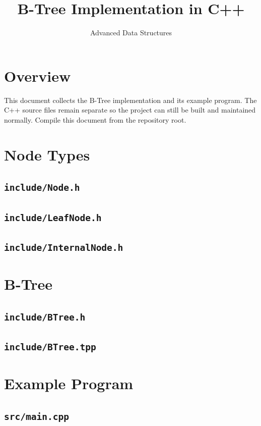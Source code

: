 \documentclass[11pt,a4paper]{article}
\title{B-Tree Implementation in C++}
\author{Advanced Data Structures}
\date{}
\begin{document}
\maketitle

\section{Overview}

This document collects the B-Tree implementation and its example program.
The C++ source files remain separate so the project can still be built and
maintained normally. Compile this document from the repository root.

\section{Node Types}

\subsection{\texttt{include/Node.h}}


\subsection{\texttt{include/LeafNode.h}}


\subsection{\texttt{include/InternalNode.h}}


\section{B-Tree}

\subsection{\texttt{include/BTree.h}}


\subsection{\texttt{include/BTree.tpp}}


\section{Example Program}

\subsection{\texttt{src/main.cpp}}

\end{document}
